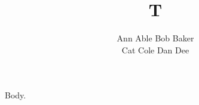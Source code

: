 \documentclass{article}
\begin{document}
\title{T}
\author{\parbox{\textwidth}{\centering Ann Able \quad Bob Baker\\ Cat Cole \quad Dan Dee}}
\maketitle
Body.
\end{document}
